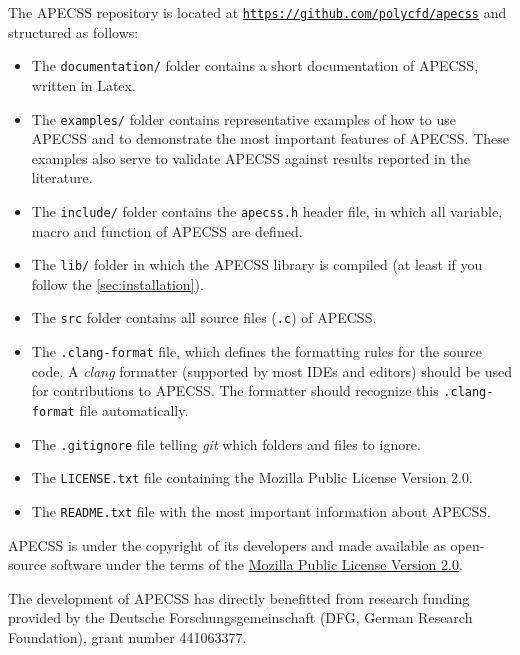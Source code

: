The APECSS repository is located at \href{https://github.com/polycfd/apecss}{\texttt{https://github.com/polycfd/apecss}} and structured as follows:\vspace{-1em}
\begin{itemize}[noitemsep]
    \item The {\tt documentation/} folder contains a short documentation of APECSS, written in Latex.
    \item The {\tt examples/} folder contains representative examples of how to use APECSS and to demonstrate the most important features of APECSS. These examples also serve to validate APECSS against results reported in the literature.
    \item The {\tt include/} folder contains the {\tt apecss.h} header file, in which all variable, macro and function of APECSS are defined.
    \item The {\tt lib/} folder in which the APECSS library is compiled (at least if you follow the \ref{sec:installation}).
    \item The {\tt src} folder contains all source files ({\tt *.c}) of APECSS.
    \item The {\tt .clang-format} file, which defines the formatting rules for the source code. A \textit{clang} formatter (supported by most IDEs and editors) should be used for contributions to APECSS. The formatter should recognize this {\tt .clang-format} file automatically.
    \item The {\tt .gitignore} file telling \textit{git} which folders and files to ignore.
    \item The {\tt LICENSE.txt} file containing the Mozilla Public License Version 2.0.
    \item The {\tt README.txt} file with the most important information about APECSS.
\end{itemize}

APECSS is under the copyright of its developers and made available as open-source software under the terms of the \href{https://www.mozilla.org/en-US/MPL/2.0/}{Mozilla Public License Version 2.0}.

The development of APECSS has directly benefitted from research funding provided by the Deutsche Forschungsgemeinschaft (DFG, German Research Foundation), grant number 441063377.
